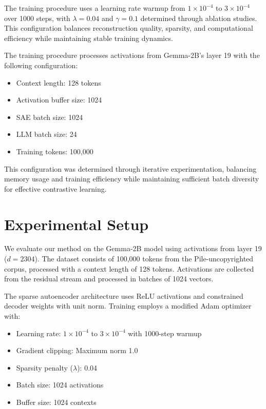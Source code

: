 \documentclass{article} %
\begin{document}
The training procedure uses a learning rate warmup from $1\times10^{-4}$ to $3\times10^{-4}$ over 1000 steps, with $\lambda=0.04$ and $\gamma=0.1$ determined through ablation studies. This configuration balances reconstruction quality, sparsity, and computational efficiency while maintaining stable training dynamics.

The training procedure processes activations from Gemma-2B's layer 19 with the following configuration:
\begin{itemize}
    \item Context length: 128 tokens
    \item Activation buffer size: 1024
    \item SAE batch size: 1024
    \item LLM batch size: 24
    \item Training tokens: 100,000
\end{itemize}

This configuration was determined through iterative experimentation, balancing memory usage and training efficiency while maintaining sufficient batch diversity for effective contrastive learning.

\section{Experimental Setup}
\label{sec:experimental}

We evaluate our method on the Gemma-2B model using activations from layer 19 ($d=2304$). The dataset consists of 100,000 tokens from the Pile-uncopyrighted corpus, processed with a context length of 128 tokens. Activations are collected from the residual stream and processed in batches of 1024 vectors.

The sparse autoencoder architecture uses ReLU activations and constrained decoder weights with unit norm. Training employs a modified Adam optimizer with:
\begin{itemize}
    \item Learning rate: $1\times10^{-4}$ to $3\times10^{-4}$ with 1000-step warmup
    \item Gradient clipping: Maximum norm 1.0
    \item Sparsity penalty ($\lambda$): 0.04
    \item Batch size: 1024 activations
    \item Buffer size: 1024 contexts
\end{itemize}
\end{document}
